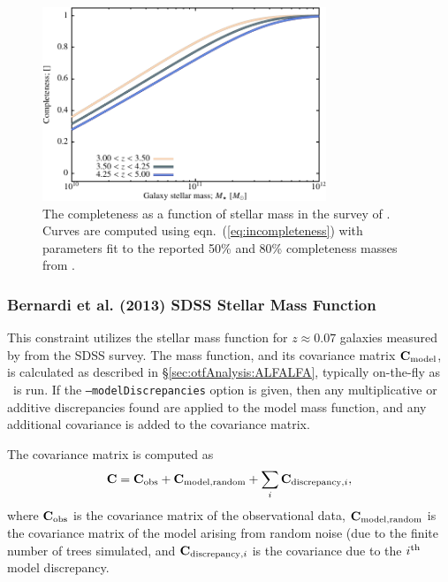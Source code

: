 \begin{figure}
 \begin{center}
 \includegraphics[width=85mm,trim=0mm 0mm 0mm 4mm,clip]{Plots/DataAnalysis/UKIDSSUDSCompleteness.pdf}
 \caption{The completeness as a function of stellar mass in the survey of \protect\cite{caputi_stellar_2011}. Curves are computed using eqn.~(\protect\ref{eq:incompleteness}) with parameters fit to the reported 50\% and 80\% completeness masses from \protect\cite{caputi_stellar_2011}.}
 \end{center}
 \label{fig:UKIDSSUDSCompleteness}
\end{figure}

\subsubsection{Bernardi et al. (2013) SDSS Stellar Mass Function}\label{sec:AnalysisBernardiSDSSStellarMassFunction}

This constraint utilizes the stellar mass function for $z\approx 0.07$ galaxies measured by \cite{bernardi_massive_2013} from the SDSS survey. The mass function, and its covariance matrix ${\bf C}_{\rm model}$, is calculated as described in \S\ref{sec:otfAnalysis:ALFALFA}, typically on-the-fly as \glc\ is run. If the {\tt --modelDiscrepancies} option is given, then any multiplicative or additive discrepancies found are applied to the model mass function, and any additional covariance is added to the covariance matrix.

The covariance matrix is computed as
\begin{equation}
 {\bf C} = {\bf C}_{\rm obs} + {\bf C}_{\rm model,random} + \sum_i {\bf C}_{{\rm discrepancy}, i},
\end{equation}
where ${\bf C}_{\rm obs}$ is the covariance matrix of the observational data, ${\bf C}_{\rm model,random}$ is the covariance matrix of the model arising from random noise (due to the finite number of trees simulated, and ${\bf C}_{{\rm discrepancy}, i}$ is the covariance due to the $i^{\rm th}$ model discrepancy.

